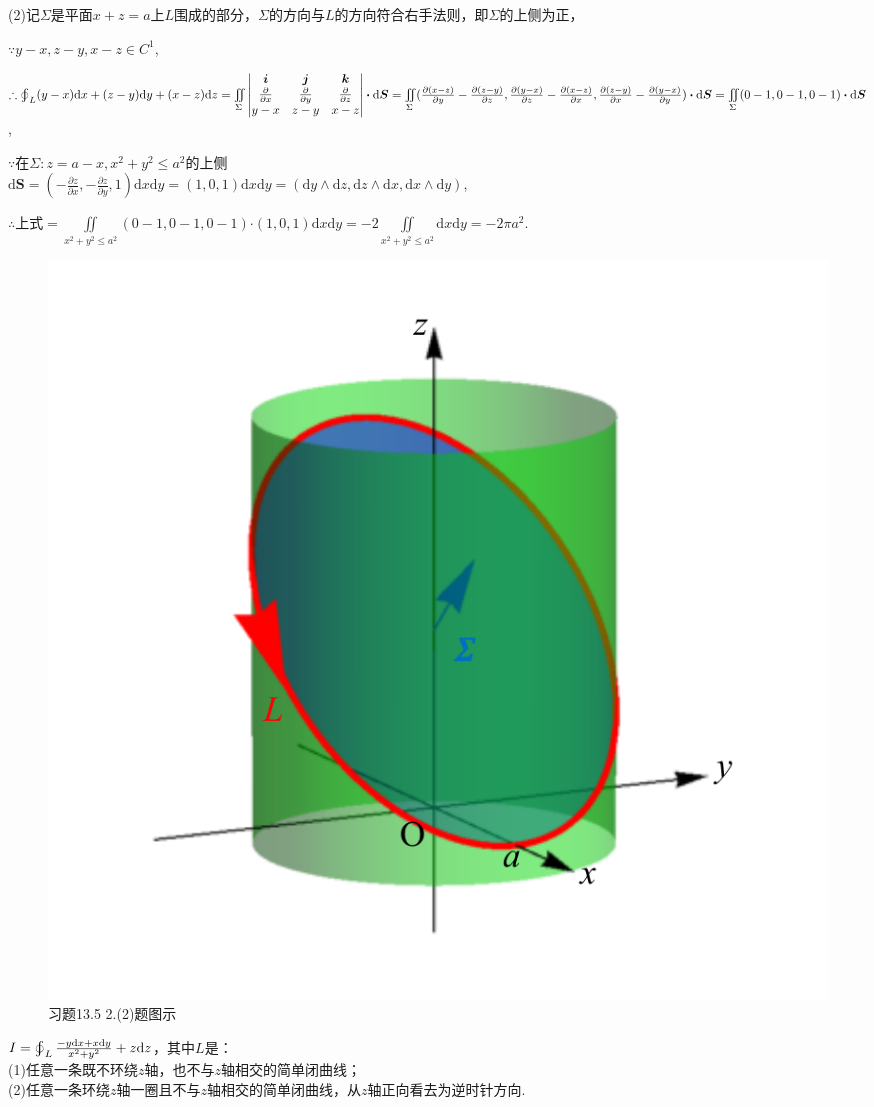 \documentclass[12pt,UTF8]{ctexart}
\newcommand{\varIInt}[4]{\iint\limits_{#1}#2\mathrm d#3\mathrm d#4}
\newcommand{\BLOInt}[2]{\varoint\nolimits_{#1}#2}
\newcommand{\md}[1]{\mathrm d#1}
\newcommand{\BSIInt}[2]{\iint\limits_{#1}#2}
\newcommand{\pp}[2]{\frac{\partial #1}{\partial #2}}
\begin{document}
\begin{enumerate}
(2)记$\Sigma$是平面$x+z=a$上$L$围成的部分，$\Sigma$的方向与$L$的方向符合右手法则，即$\Sigma$的上侧为正，

$\because y-x,z-y,x-z\in C^1$,

$\therefore\BLOInt L{(y-x)\md x+(z-y)\md y+(x-z)\md z}=\BSIInt\Sigma{\begin{vmatrix}
\bm i&\bm j&\bm k\\
\frac\partial{\partial x}&\frac\partial{\partial y}&\frac\partial{\partial z}\\
y-x&z-y&x-z
\end{vmatrix}\bm\cdot\md\bm S}\\
=\BSIInt\Sigma{(\pp{(x-z)}y-\pp{(z-y)}z,\pp{(y-x)}z-\pp{(x-z)}x,\pp{(z-y)}x-\pp{(y-x)}y)\bm\cdot\md\bm S}=\BSIInt\Sigma{(0-1,0-1,0-1)\bm\cdot\md\bm S}$,

$\because$在$\Sigma:z=a-x,x^2+y^2\leqslant a^2$的上侧\\
$\md\bm S=(-\pp zx,-\pp zy,1)\md x\md y=(1,0,1)\md x\md y=(\md y\wedge\md z,\md z\wedge\md x,\md x\wedge\md y)$,

$\therefore$上式$=\varIInt{x^2+y^2\leqslant a^2}{(0-1,0-1,0-1)\bm\cdot(1,0,1)}xy=-2\varIInt{x^2+y^2\leqslant a^2}{}xy=-2\pi a^2$.

\begin{figure}[H]
\begin{center}
\includegraphics[height=0.5\textheight]{Figures24/Fig13-5-2-2.pdf}
\end{center}
\caption{习题13.5 2.(2)题图示}
\label{13-5-2-2}
\end{figure}
$I=\BLOInt L{\frac{-y\md x+x\md y}{x^2+y^2}+z\md z}$，其中$L$是：\\
(1)任意一条既不环绕$z$轴，也不与$z$轴相交的简单闭曲线；\\
(2)任意一条环绕$z$轴一圈且不与$z$轴相交的简单闭曲线，从$z$轴正向看去为逆时针方向.


\end{enumerate}
\end{document}
